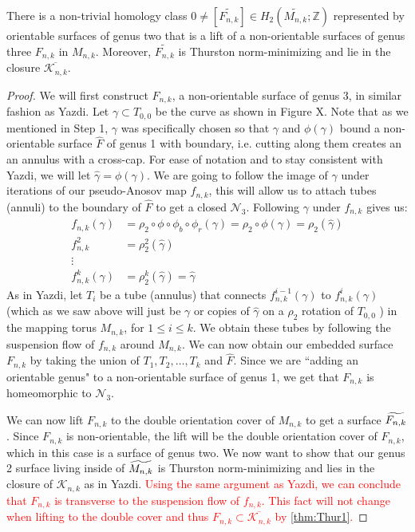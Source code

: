 \begin{lem}
\label{lem:genus3}
There is a non-trivial homology class $0 \neq [\widetilde{F_{n,k}}] \in H_2(\widetilde{M_{n,k}};\mathbb{Z})$ represented by orientable surfaces of genus two that is a lift of a non-orientable surfaces of genus three $F_{n,k}$ in $M_{n,k}$. Moreover, $\widetilde{F_{n,k}}$ is Thurston norm-minimizing and lie in the closure $\overline{\mathcal{K}_{n,k}}$.
\end{lem}
\begin{proof}
    We will first construct $F_{n,k}$, a non-orientable surface of genus 3, in  similar fashion as Yazdi. Let $\gamma \subset T_{0,0}$ be the curve as shown in Figure X. Note that as we mentioned in Step 1, $\gamma$ was specifically chosen so that $\gamma$ and $\phi(\gamma)$ bound a non-orientable surface $\hat{F}$ of genus 1 with boundary, i.e. cutting along them creates an an annulus with a cross-cap. For ease of notation and to stay consistent with Yazdi, we will let $\hat{\gamma} = \phi(\gamma)$. We are going to follow the image of $\gamma$ under iterations of our pseudo-Anosov map $f_{n,k}$, this will allow us to attach tubes (annuli) to the boundary of $\hat{F}$ to get a closed $\mathcal{N}_3$. Following $\gamma$ under $f_{n,k}$ gives us:
    \begin{align*}
        f_{n,k}(\gamma) &= \rho_2 \circ \phi \circ \phi_b \circ \phi_r(\gamma) = \rho_2 \circ \phi(\gamma) = \rho_2(\hat{\gamma}) \\
        f^2_{n,k} &= \rho_2^2(\hat{\gamma}) \\
        \vdots& \\
        f^k_{n,k}(\gamma) &= \rho_2^k(\hat{\gamma}) = \hat{\gamma}
    \end{align*}
    As in Yazdi, let $T_i$ be a tube (annulus) that connects $f_{n,k}^{i-1}(\gamma)$ to $f_{n,k}^i(\gamma)$ (which as we saw above will just be $\gamma$ or copies of $\hat{\gamma}$ on a $\rho_2$ rotation of $T_{0,0}$ ) in the mapping torus $M_{n,k}$, for $1 \leq i \leq k$. We obtain these tubes by following the suspension flow of $f_{n,k}$ around $M_{n,k}$. We can now obtain our embedded surface $F_{n,k}$ by taking the union of $T_1,T_2,\dots,T_k$ and $\hat{F}$. Since we are ``adding an orientable genus" to a non-orientable surface of genus 1, we get that $F_{n,k}$ is homeomorphic to $\mathcal{N}_3$.
    
    
    We can now lift $F_{n,k}$ to the double orientation cover of $M_{n,k}$ to get a surface $\widetilde{F_{n,k}}$. Since $F_{n,k}$ is non-orientable, the lift will be the double orientation cover of $F_{n,k}$, which in this case is a surface of genus two. We now want to show that our genus 2 surface living inside of $\widetilde{M_{n,k}}$ is Thurston norm-minimizing and lies in the closure of $\mathcal{K}_{n,k}$ as in Yazdi. \textcolor{red}{Using the same argument as Yazdi, we can conclude that $F_{n,k}$ is transverse to the suspension flow of $f_{n,k}$. This fact will not change when lifting to the double cover and thus $F_{n,k} \subset \overline{\mathcal{K}_{n,k}}$ by \ref{thm:Thur1}.}
    

\end{proof}
